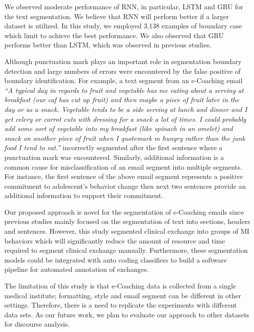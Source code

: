 \documentclass{amia}
\begin{document}

We observed moderate performance of RNN, in particular, LSTM and GRU for the text segmentation. We believe that RNN will perform better if a larger dataset is utilized. In this study, we employed 3,138 examples of boundary case which limit to achieve the best performance. We also observed that GRU performs better than LSTM, which was observed in previous studies\cite{chung2014empirical}.

Although punctuation mark plays an important role in segmentation boundary detection and large numbers of errors were encountered by the false positive of boundary identification. For example, a text segment from an e-Coaching email \textit{``A typical day in regards to fruit and vegetable has me eating about a serving at breakfast (our caf has cut up fruit) and then maybe a piece of fruit later in the day or as a snack. Vegetable tends to be a side serving at lunch and dinner and I get celery or carrot cuts with dressing for a snack a lot of times. I could probably add some sort of vegetable into my breakfast (like spinach in an omelet) and snack on another piece of fruit when I quotemark m hungry rather than the junk food I tend to eat.''} incorrectly segmented after the first sentence where a punctuation mark was encountered. Similarly, additional information is a common cause for misclassification of an email segment into multiple segments. For instance, the first sentence of the above email segment represents a positive commitment to adolescent's behavior change then next two sentences provide an additional information to support their commitment. 

Our proposed approach is novel for the segmentation of e-Coaching emails since previous studies mainly focused on the segmentation of text into sections, headers and sentences. However, this study segmented clinical exchange into groups of MI behaviors which will significantly reduce the amount of resource and time required to segment clinical exchange manually. Furthermore, these segmentation models could be integrated with auto coding classifiers to build a software pipeline for automated annotation of exchanges.

The limitation of this study is that e-Coaching data is collected from a single medical institute; formatting, style and email segment can be different in other settings. Therefore, there is a need to replicate the experiments with different data sets. As our future work, we plan to evaluate our approach to other datasets for discourse analysis. 
 
\end{document}
